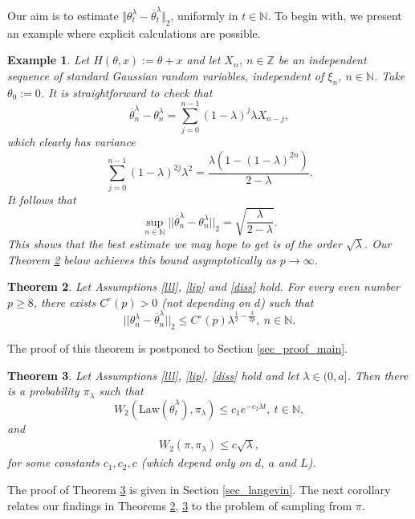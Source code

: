 \documentclass[a4paper]{article}
\newtheorem{theorem}{Theorem}[section]
\newtheorem{example}[theorem]{Example}
\begin{document}
Our aim is to estimate
$\Vert\theta^{\lambda}_t-\overline{\theta}^{\lambda}_t\Vert_2$,
uniformly in $t \in \mathbb{N}$. To begin with, we present an example where explicit calculations are possible.

\begin{example} {\rm Let $H(\theta,x):=\theta+x$ and let $X_n$, $n\in\mathbb{Z}$
		be an independent sequence of standard Gaussian random variables,
		independent of $\xi_n$, $n\in\mathbb{N}$. Take $\theta_0:=0$.
		It is straightforward to check that
		$$
		\overline{\theta}^{\lambda}_n-\theta^{\lambda}_n=\sum_{j=0}^{n-1}
		(1-\lambda)^j \lambda X_{n-j},
		$$
		which clearly has variance
		$$
		\sum_{j=0}^{n-1}(1-\lambda)^{2j}\lambda^2=\frac{\lambda(1-(1-\lambda)^{2n})}
		{2-\lambda}.
		$$
		It follows that
		$$
		\sup_{n\in\mathbb{N}}||\overline{\theta}^{\lambda}_n-\theta^{\lambda}_n||_2=\sqrt{\frac{\lambda}{2-\lambda}}.
		$$
		This shows that the best estimate we may hope to get is of the
		order $\sqrt{\lambda}$.
		Our Theorem \ref{main} below achieves this bound
asymptotically as $p\to\infty$.}
\end{example}


\begin{theorem}\label{main}
	Let Assumptions \ref{lll}, \ref{lip} and \ref{diss} hold. For every even number $p\geq 8$, there exists $C^{\circ}(p)>0$ (not depending on $d$)
such that \begin{equation}
	||\theta^{\lambda}_n-\overline{\theta}^{\lambda}_n||_2
	\leq C^{\circ}(p)\lambda^{\frac{1}{2} - \frac{3}{2p}},\ n\in\mathbb{N}.
	\end{equation}
\end{theorem}
The proof of this theorem is postponed to Section \ref{sec_proof_main}.

\begin{theorem}\label{thm6}
	Let Assumptions \ref{lll}, \ref{lip}, \ref{diss} hold and let $\lambda \in (0,a]$. Then there is a probability $\pi_{\lambda}$ such that
$$
W_2(\mathrm{Law}(\overline{\theta}^{\lambda}_t),\pi_{\lambda})\leq
c_1 e^{-c_2\lambda t},\ t\in\mathbb{N},
$$
and
	\begin{align*}
	W_2(\pi,\pi_{\lambda})\leq c\sqrt{\lambda},
	\end{align*}
for some constants $c_1,c_2,c$ (which depend only on $d$, $a$ and $L$).
\end{theorem}

The proof of Theorem \ref{thm6} is given in Section \ref{sec_langevin}. The next corollary relates our findings in Theorems \ref{main}, \ref{thm6} to the problem of sampling from $\pi$.
\end{document}
